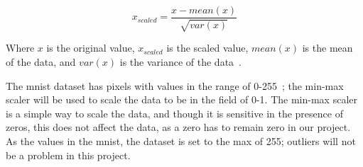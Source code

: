 \begin{equation}
    x_{scaled} = \frac{x - mean(x)}{\sqrt{var(x)}}
\end{equation}

Where $x$ is the original value, $x_{scaled}$ is the scaled value, $mean(x)$ is the mean of the data, and $var(x)$ is the variance of the data~\cite{Feature-engineering-zheng}.


The \gls{mnist} dataset has pixels with values in the range of 0-255~\cite{lecun-mnist-database}; the min-max scaler will be used to scale the data to be in the field of 0-1. The min-max scaler is a simple way to scale the data, and though it is sensitive in the presence of zeros, this does not affect the data, as a zero has to remain zero in our project. As the values in the \gls{mnist}, the dataset is set to the max of 255; outliers will not be a problem in this project.